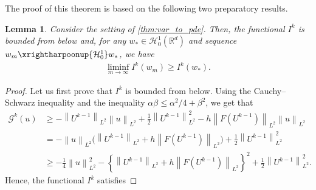 \documentclass[11pt,a4paper,reqno]{amsart}
\numberwithin{equation}{section}
\theoremstyle{plain}
\newtheorem{lemma}[theorem]{Lemma}
\theoremstyle{definition}
\newcommand{\tsigma}{\tilde \sigma }
\newcommand{\cH}{\mathcal{H}}
\newcommand{\R}{\mathbb{R}}
\newcommand{\norm}[1]{\left\|#1 \right\|} %
\begin{document}
The proof of this theorem is based on the following two preparatory results.

\begin{lemma}
\label{lem:weak_con}
Consider the setting of \cref{thm:var_to_pde}. 
Then, the functional $I^k$ is bounded from below and, for any $w_*\in \cH_0^1(\R^d)$ and sequence $w_m \xrightharpoonup{\mathcal{H}_0^1} w_*$, we have
\begin{align*}
    \liminf_{m \to \infty} I^k \left( w_m \right) \ge I^k \left( w_* \right).
\end{align*}
\end{lemma}

\begin{proof}
Let us first prove that $I^k$ is bounded from below. 
Using the Cauchy--Schwarz inequality and the inequality $\alpha\beta\leq \alpha^2/4+\beta^2$, we get that
\begin{align*}
\mathcal{G}^k (u) 
    & \ge - \norm{U^{k - 1}}_{L^2} \norm{u}_{L^2} + \frac{1}{2} \norm{U^{k - 1}}^2_{L^2} - h \norm{F \left( U^{k - 1} \right)}_{L^2} \norm{u}_{L^2} \\ 
    &= - \norm{u}_{L^2}\Big(\norm{U^{k - 1}}_{L^2}+ h \norm{F \left( U^{k - 1} \right)}_{L^2}\Big) + \frac{1}{2} \norm{U^{k - 1}}^2_{L^2}  \\
    &\ge - \frac{1}{4} \norm{u}^2_{L^2} - \left\{ \norm{U^{k - 1}}_{L^2} + h \norm{F \left( U^{k - 1} \right)}_{L^2} \right\} ^2 + \frac{1}{2} \norm{U^{k - 1}}^2_{L^2}.
\end{align*}
Hence, the functional $I^k$ satisfies

\end{proof}
\end{document}
